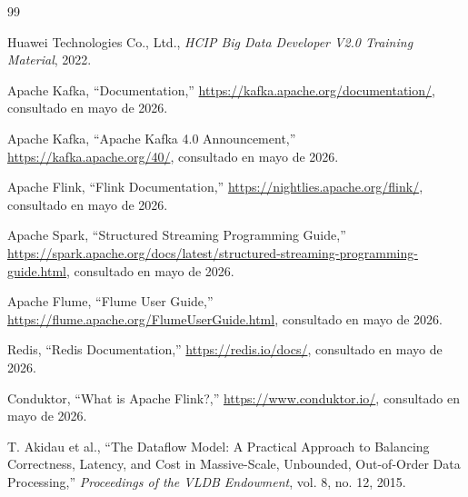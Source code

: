 \documentclass[12pt,a4paper]{article}
\begin{document}
\begin{thebibliography}{99}

Huawei Technologies Co., Ltd., \textit{HCIP Big Data Developer V2.0 Training Material}, 2022.

Apache Kafka, ``Documentation,'' \url{https://kafka.apache.org/documentation/}, consultado en mayo de 2026.

Apache Kafka, ``Apache Kafka 4.0 Announcement,'' \url{https://kafka.apache.org/40/}, consultado en mayo de 2026.

Apache Flink, ``Flink Documentation,'' \url{https://nightlies.apache.org/flink/}, consultado en mayo de 2026.

Apache Spark, ``Structured Streaming Programming Guide,'' \url{https://spark.apache.org/docs/latest/structured-streaming-programming-guide.html}, consultado en mayo de 2026.

Apache Flume, ``Flume User Guide,'' \url{https://flume.apache.org/FlumeUserGuide.html}, consultado en mayo de 2026.

Redis, ``Redis Documentation,'' \url{https://redis.io/docs/}, consultado en mayo de 2026.

Conduktor, ``What is Apache Flink?,'' \url{https://www.conduktor.io/}, consultado en mayo de 2026.

T. Akidau et al., ``The Dataflow Model: A Practical Approach to Balancing Correctness, Latency, and Cost in Massive-Scale, Unbounded, Out-of-Order Data Processing,'' \textit{Proceedings of the VLDB Endowment}, vol. 8, no. 12, 2015.

\end{thebibliography}
\end{document}
